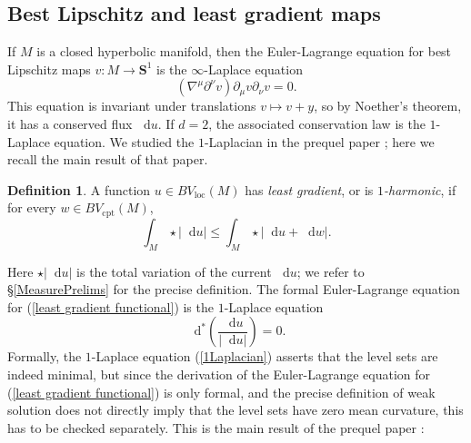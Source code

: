 \documentclass[reqno,11pt]{amsart}
\newcommand{\Sph}{\mathbf S}
\newcommand*\dif{\mathop{}\!\mathrm{d}}
\newcommand{\dfn}[1]{\emph{#1}\index{#1}}
\newcommand{\loc}{\mathrm{loc}}
\newcommand{\cpt}{\mathrm{cpt}}
\theoremstyle{definition}
\newtheorem{definition}[theorem]{Definition}
\numberwithin{equation}{section}
\begin{document}
\subsection{Best Lipschitz and least gradient maps}\label{FLG section}
If $M$ is a closed hyperbolic manifold, then the Euler-Lagrange equation for best Lipschitz maps $v: M \to \Sph^1$ is the $\infty$-Laplace equation \cite{daskalopoulos2020transverse}
\begin{equation}\label{infinity laplacian}
(\nabla^\mu \partial^\nu v) \partial_\mu v \partial_\nu v = 0.
\end{equation}
This equation is invariant under translations $v \mapsto v + y$, so by Noether's theorem, it has a conserved flux $\dif u$.
If $d = 2$, the associated conservation law is the $1$-Laplace equation.
We studied the $1$-Laplacian in the prequel paper \cite{BackusFLG}; here we recall the main result of that paper.

\begin{definition}
A function $u \in BV_\loc(M)$ has \dfn{least gradient}, or is \dfn{$1$-harmonic}, if for every $w \in BV_\cpt(M)$,
\begin{equation}\label{least gradient functional}
\int_M \star |\dif u| \leq \int_M \star |\dif u + \dif w|.
\end{equation}
\end{definition}

Here $\star |\dif u|$ is the total variation of the current $\dif u$; we refer to \S\ref{MeasurePrelims} for the precise definition.
The formal Euler-Lagrange equation for (\ref{least gradient functional}) is the $1$-Laplace equation
\begin{equation}\label{1Laplacian}
\dif^* \left(\frac{\dif u}{|\dif u|}\right) = 0.
\end{equation}
Formally, the $1$-Laplace equation (\ref{1Laplacian}) asserts that the level sets are indeed minimal, but since the derivation of the Euler-Lagrange equation for (\ref{least gradient functional}) is only formal, and the precise definition of weak solution \cite{Mazon14} does not directly imply that the level sets have zero mean curvature, this has to be checked separately.
This is the main result of the prequel paper \cite{BackusFLG}:
\end{document}
